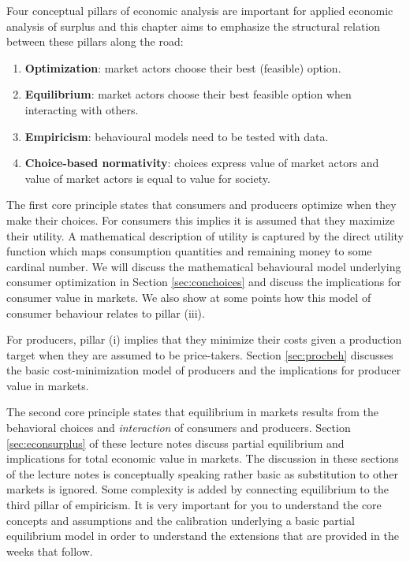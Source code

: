 \documentclass[
]{book}
\providecommand{\tightlist}{%
  \setlength{\itemsep}{0pt}\setlength{\parskip}{0pt}}
\begin{document}
Four conceptual pillars of economic analysis are important for applied economic analysis of surplus and this chapter aims to emphasize the structural relation between these pillars along the road:

\begin{enumerate}
\def\labelenumi{\roman{enumi}.}
\tightlist
\item
  \textbf{Optimization}: market actors choose their best (feasible) option.
\item
  \textbf{Equilibrium}: market actors choose their best feasible option when interacting with others.
\item
  \textbf{Empiricism}: behavioural models need to be tested with data.
\item
  \textbf{Choice-based normativity}: choices express value of market actors and value of market actors is equal to value for society.
\end{enumerate}

The first core principle states that consumers and producers optimize when they make their choices. For consumers this implies it is assumed that they maximize their utility. A mathematical description of utility is captured by the direct utility function which maps consumption quantities and remaining money to some cardinal number. We will discuss the mathematical behavioural model underlying consumer optimization in Section \ref{sec:conchoices} and discuss the implications for consumer value in markets. We also show at some points how this model of consumer behaviour relates to pillar (iii).

For producers, pillar (i) implies that they minimize their costs given a production target when they are assumed to be price-takers. Section \ref{sec:procbeh} discusses the basic cost-minimization model of producers and the implications for producer value in markets.

The second core principle states that equilibrium in markets results from the behavioral choices and \emph{interaction} of consumers and producers. Section \ref{sec:econsurplus} of these lecture notes discuss partial equilibrium and implications for total economic value in markets. The discussion in these sections of the lecture notes is conceptually speaking rather basic as substitution to other markets is ignored. Some complexity is added by connecting equilibrium to the third pillar of empiricism. It is very important for you to understand the core concepts and assumptions and the calibration underlying a basic partial equilibrium model in order to understand the extensions that are provided in the weeks that follow.
\end{document}
